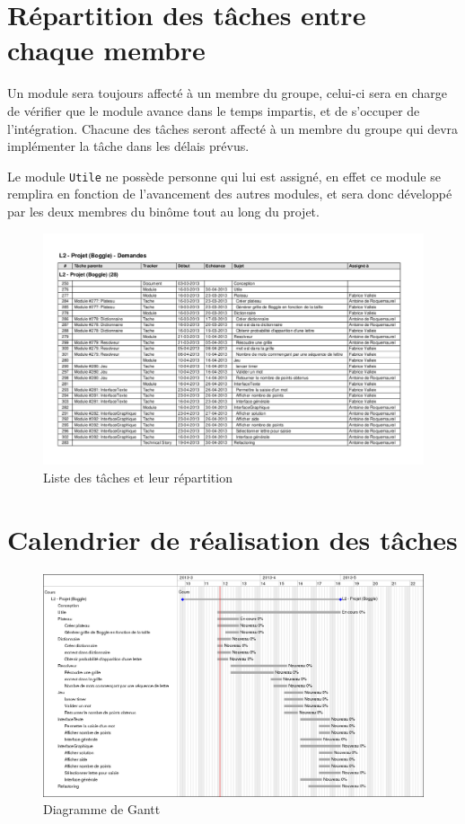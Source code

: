 \documentclass[12pt,a4paper,openany]{article}
\begin{document}
	\section{Répartition des tâches entre chaque membre}
	Un module sera toujours affecté à un membre du groupe, celui-ci sera en charge de vérifier que le module avance dans le temps impartis, et de s'occuper de
	l'intégration. Chacune des tâches seront affecté à un membre du groupe qui devra implémenter la tâche dans les délais prévus.

	Le module \texttt{Utile} ne possède personne qui lui est assigné, en effet ce module se remplira en fonction de l'avancement des autres modules, et sera donc
	développé par les deux membres du binôme tout au long du projet.
	\begin{figure}[H]
		\centering
		\includegraphics[angle=-90,width=15.2cm]{taches.pdf}
		\caption{Liste des tâches et leur répartition}
	\end{figure}
	\section{Calendrier de réalisation des tâches}
	\begin{figure}[H]
		\centering
		\includegraphics[angle=-90,width=14.2cm]{gantt.png}
		\caption{Diagramme de Gantt}
	\end{figure}
\end{document}

